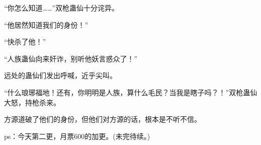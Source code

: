 \begin{this_body}
“你怎么知道……”双枪蛊仙十分诧异。

“他居然知道我们的身份！”

“快杀了他！”

“人族蛊仙向来奸诈，别听他妖言惑众了！”

远处的蛊仙们发出呼喊，近乎尖叫。

“什么琅琊福地！还有，你明明是人族，算什么毛民？当我是瞎子吗？！”双枪蛊仙大怒，持枪杀来。

方源道破了他们的身份，但他们对方源的话，根本是不听不信。

ps：今天第二更，月票600的加更。(未完待续。)

\end{this_body}

